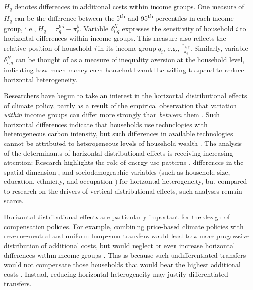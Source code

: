 \documentclass[12pt, a4paper]{article}
\begin{document}
$H_{q}$ denotes differences in additional costs within income groups. One measure of $H_{q}$ can be the difference between the 5\textsuperscript{th} and 95\textsuperscript{th} percentiles in each income group, i.e., $H_{q}=\pi_{q}^{95}-\pi_{q}^{5}$. Variable $\delta_{i,q}^{H}$ expresses the sensitivity of household \textit{i} to horizontal differences within income groups. This measure also reflects the relative position of household \textit{i} in its income group $q_{i}$, e.g., $\frac{\pi_{i,q}}{\overline{\pi_{q}}}$. Similarly, variable $\delta_{i,q}^{H}$ can be thought of as a measure of inequality aversion at the household level, indicating how much money each household would be willing to spend to reduce horizontal heterogeneity.

Researchers have begun to take an interest in the horizontal distributional effects of climate policy, partly as a result of the empirical observation that variation \textit{within} income groups can differ more strongly than \textit{between} them \autocite{Cronin.2019,Steckel.2021b,Pizer.2019}. Such horizontal differences indicate that households use technologies with heterogeneous carbon intensity, but such differences in available technologies cannot be attributed to heterogeneous levels of household wealth \autocite{Hansel.2022}. The analysis of the determinants of horizontal distributional effects is receiving increasing attention: Research highlights the role of energy use patterns \autocite{Steckel.2021b,Missbach.2024}, differences in the spatial dimension \autocite{Chan.2023,Burtraw.2009}, and sociodemographic variables (such as household size, education, ethnicity, and occupation \autocite{Grainger.2010,Buchs.2013,Farrell.2017,Missbach.2023,Fremstad.2019}) for horizontal heterogeneity, but compared to research on the drivers of vertical distributional effects, such analyses remain scarce.

Horizontal distributional effects are particularly important for the design of compensation policies. For example, combining price-based climate policies with revenue-neutral and uniform lump-sum transfers would lead to a more progressive distribution of additional costs, but would neglect or even increase horizontal differences within income groups \autocite{Cronin.2019,Hansel.2022}. This is because such undifferentiated transfers would not compensate those households that would bear the highest additional costs \autocite{Fullerton.2019,Missbach.2024,Sallee.2019}. Instead, reducing horizontal heterogeneity may justify differentiated transfers.
\end{document}
